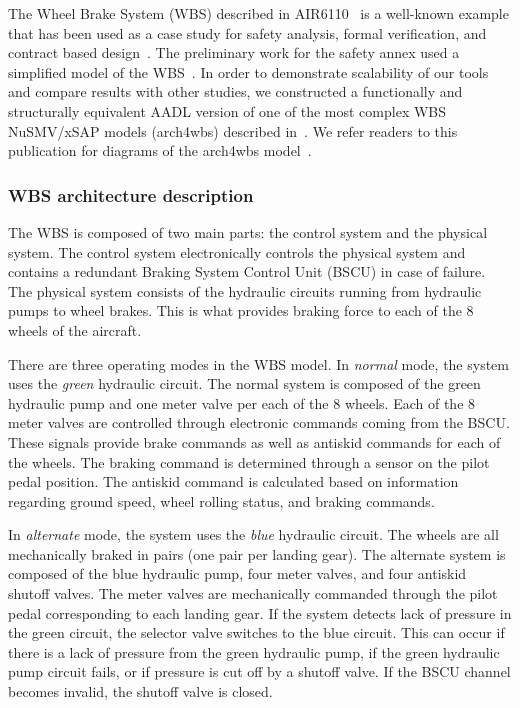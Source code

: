 The Wheel Brake System (WBS) described in AIR6110~\cite{AIR6110} is a well-known example that has been used as a case study for safety analysis, formal verification, and contract based design~\cite{DBLP:conf/cav/BozzanoCPJKPRT15, 10.1007/978-3-319-11936-6-7, CAV2015:BoCiGrMa, Joshi05:SafeComp}. The preliminary work for the safety annex used a simplified model of the WBS~\cite{Stewart17:IMBSA}. In order to demonstrate scalability of our tools and compare results with other studies, we constructed a functionally and structurally equivalent AADL version of one of the most complex WBS NuSMV/xSAP models (arch4wbs) described in~\cite{DBLP:conf/cav/BozzanoCPJKPRT15}. We refer readers to this publication for diagrams of the arch4wbs model~\cite{DBLP:conf/cav/BozzanoCPJKPRT15}.   

\subsubsection{WBS architecture description}
The WBS is composed of two main parts: the control system and the physical system. The control system electronically controls the physical system and contains a redundant Braking System Control Unit (BSCU) in case of failure. The physical system consists of the hydraulic circuits running from hydraulic pumps to wheel brakes. This is what provides braking force to each of the 8 wheels of the aircraft.

There are three operating modes in the WBS model. In \textit{normal} mode, the system uses the \textit{green} hydraulic circuit. The normal system is composed of the green hydraulic pump and one meter valve per each of the 8 wheels. Each of the 8 meter valves are controlled through electronic commands coming from the BSCU. These signals provide brake commands as well as antiskid commands for each of the wheels. The braking command is determined through a sensor on the pilot pedal position. The antiskid command is calculated based on information regarding ground speed, wheel rolling status, and braking commands.

In \textit{alternate} mode, the system uses the \textit{blue} hydraulic circuit.  The wheels are all mechanically braked in pairs (one pair per landing gear). The alternate system is composed of the blue hydraulic pump, four meter valves, and four antiskid shutoff valves. The meter valves are mechanically commanded through the pilot pedal corresponding to each landing gear. If the system detects lack of pressure in the green circuit, the selector valve switches to the blue circuit. This can occur if there is a lack of pressure from the green hydraulic pump, if the green hydraulic pump circuit fails, or if pressure is cut off by a shutoff valve. If the BSCU channel becomes invalid, the shutoff valve is closed.

